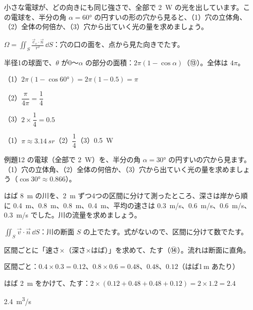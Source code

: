 \begin{reidai}
小さな電球が、どの向きにも同じ強さで、全部で \qty{2}{W} の光を出しています。この電球を、半分の角 $\alpha=\ang{60}$ の円すいの形の穴から見ると、（1）穴の立体角、（2）全体の何倍か、（3）穴から出ていく光の量を求めましょう。\par
\kangaekata {}\par
{}\enspace $\displaystyle\Omega=\iint_S\frac{\vec e_r\cdot\vec n}{r^2}\,\dd S$：穴の口の面を、点から見た向きでたす。\par
{}\enspace 半径1の球面で、$\theta$ が0〜$\alpha$ の部分の面積：$2\pi(1-\cos\alpha)$（⑬）。全体は $4\pi$。\par
\shiki\kviiiis{}\zw{} （1）$2\pi(1-\cos\ang{60})=2\pi(1-0.5)=\pi$\par
\kviiiia （2）$\dfrac{\pi}{4\pi}=\dfrac14$\par
\kviiiia （3）$2\times\dfrac14=0.5$\par
\kotae\kviiiis{}\zw{} （1）$\pi\approx\qty{3.14}{sr}$\quad （2）$\dfrac14$\quad （3）\qty{0.5}{W}
\end{reidai}

\begin{jibun}
例題12 の電球（全部で \qty{2}{W}）を、半分の角 $\alpha=\ang{30}$ の円すいの穴から見ます。（1）穴の立体角、（2）全体の何倍か、（3）穴から出ていく光の量を求めましょう（$\cos\ang{30}\approx0.866$）。
\end{jibun}

\begin{reidai}[データから川の流量を求める]
はば \qty{8}{m} の川を、\qty{2}{m} ずつ4つの区間に分けて測ったところ、深さは岸から順に \qty{0.4}{m}、\qty{0.8}{m}、\qty{0.8}{m}、\qty{0.4}{m}、平均の速さは \qty{0.3}{m/s}、\qty{0.6}{m/s}、\qty{0.6}{m/s}、\qty{0.3}{m/s} でした。川の流量を求めましょう。\par
\kangaekata {}\par
{}\enspace $\displaystyle\iint_S\vec v\cdot\vec n\,\dd S$：川の断面 $S$ の上でたす。式がないので、区間に分けて数でたす。\par
{}\enspace 区間ごとに「速さ×（深さ×はば）」を求めて、たす（⑭）。流れは断面に直角。\par
\shiki\kviiiis{}\zw{} 区間ごと：$0.4\times0.3=0.12$、$0.8\times0.6=0.48$、$0.48$、$0.12$（はば1\,m あたり）\par
\kviiiia はば \qty{2}{m} をかけて、たす：$2\times(0.12+0.48+0.48+0.12)=2\times1.2=2.4$\par
\kotae\kviiiis{}\zw{} \qty{2.4}{m^3/s}
\end{reidai}

